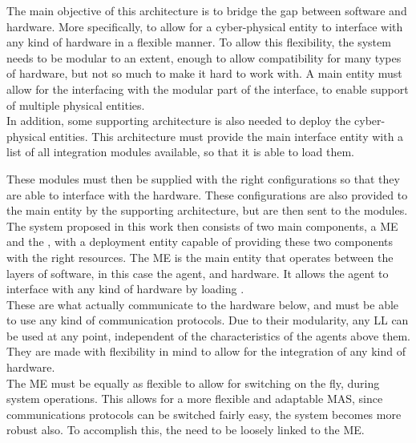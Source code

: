 The main objective of this architecture is to bridge the gap between software and hardware. More specifically, to allow for a cyber-physical entity to interface with any kind of hardware in a flexible manner. To allow this flexibility, the system needs to be modular to an extent, enough to allow compatibility for many types of hardware, but not so much to make it hard to work with. A main entity must allow for the interfacing with the modular part of the interface, to enable support of multiple physical entities.\\ 

In addition, some supporting architecture is also needed to deploy the cyber-physical entities. This architecture must provide the main interface entity with a list of all integration modules available, so that it is able to load them.

These modules must then be supplied with the right configurations so that they are able to interface with the hardware. These configurations are also provided to the main entity by the supporting architecture, but are then sent to the modules.\\

The system proposed in this work then consists of two main components, a \acrfull{ME} and the , with a deployment entity capable of providing these two components with the right resources. The \acrlong{ME} is the main entity that operates between the layers of software, in this case the agent, and hardware. It allows the agent to interface with any kind of hardware by loading .\\

These  are what actually communicate to the hardware below, and must be able to use any kind of communication protocols. Due to their modularity, any \acrshort{LL} can be used at any point, independent of the characteristics of the agents above them. They are made with flexibility in mind to allow for the integration of any kind of hardware.\\

The \acrshort{ME} must be equally as flexible to allow for switching on the fly, during system operations. This allows for a more flexible and adaptable \acrshort{MAS}, since communications protocols can be switched fairly easy, the system becomes more robust also. To accomplish this, the  need to be loosely linked to the \acrshort{ME}.\\

